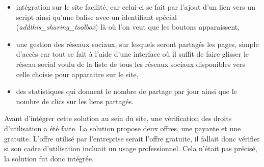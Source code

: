 \documentclass[12pt,a4paper]{article}
\begin{document}
\begin{itemize}
\item intégration sur le site facilité, car celui-ci se fait par l'ajout d'un lien vers un script ainsi qu'une balise avec un identifiant spécial (\textit{addthis\_sharing\_toolbox}) là où l'on veut que les boutons apparaissent,
\item une gestion des réseaux sociaux, sur lesquels seront partagés les pages, simple d'accès car tout se fait à l'aide d'une interface où il suffit de faire glisser le réseau social voulu de la liste de tous les réseaux sociaux disponibles vers celle choisie pour apparaitre sur le site,
\item des statistiques qui donnent le nombre de partage par jour ainsi que le nombre de clics sur les liens partagés.
\end{itemize}\par
Avant d'intégrer cette solution au sein du site, une vérification des droits d'utilisation a été faite. La solution propose deux offres, une payante et une gratuite. L'offre utilisé par l'entreprise serait l'offre gratuite, il fallait donc vérifier si son cadre d'utilisation incluait un usage professionnel. Cela n'était pas précisé, la solution fut donc intégrée.\par
\end{document}
